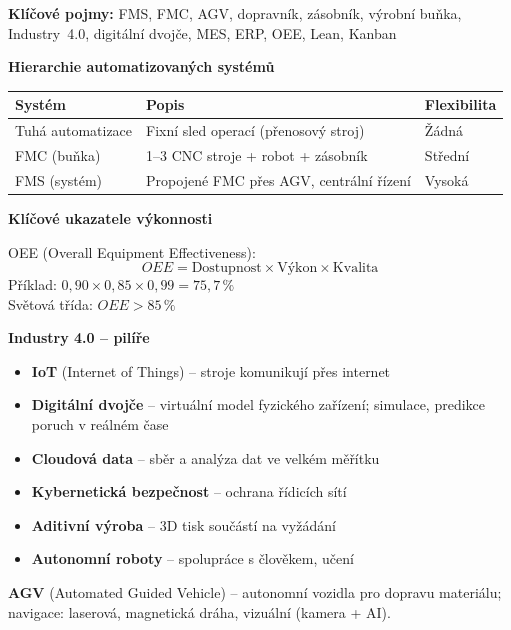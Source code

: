 \documentclass[a4paper,10pt]{article}
\begin{document}
\begin{pojmybox}
\textbf{Klíčové pojmy:}
FMS, FMC, AGV, dopravník, zásobník, výrobní buňka,
Industry~4.0, digitální dvojče, MES, ERP, OEE, Lean, Kanban
\end{pojmybox}

\begin{vysvetlenibox}
\textbf{Hierarchie automatizovaných systémů}

\begin{center}
\begin{tabularx}{0.95\linewidth}{@{} l X X @{}}
    \toprule
    \textbf{Systém} & \textbf{Popis} & \textbf{Flexibilita} \\
    \midrule
    Tuhá automatizace & Fixní sled operací (přenosový stroj) & Žádná \\
    FMC (buňka)      & 1--3 CNC stroje + robot + zásobník & Střední \\
    FMS (systém)     & Propojené FMC přes AGV, centrální řízení & Vysoká \\
    \bottomrule
\end{tabularx}
\end{center}

\textbf{Klíčové ukazatele výkonnosti}

\begin{vzorcebox}
OEE (Overall Equipment Effectiveness):
$$OEE = \text{Dostupnost} \times \text{Výkon} \times \text{Kvalita}$$
Příklad: $0{,}90 \times 0{,}85 \times 0{,}99 = 75{,}7\,\%$\\
Světová třída: $OEE > 85\,\%$
\end{vzorcebox}

\textbf{Industry 4.0 -- pilíře}
\begin{itemize}[noitemsep, leftmargin=1.4em, topsep=4pt]
    \item \textbf{IoT} (Internet of Things) -- stroje komunikují přes internet
    \item \textbf{Digitální dvojče} -- virtuální model fyzického zařízení;
          simulace, predikce poruch v reálném čase
    \item \textbf{Cloudová data} -- sběr a analýza dat ve velkém měřítku
    \item \textbf{Kybernetická bezpečnost} -- ochrana řídicích sítí
    \item \textbf{Aditivní výroba} -- 3D tisk součástí na vyžádání
    \item \textbf{Autonomní roboty} -- spolupráce s člověkem, učení
\end{itemize}

\textbf{AGV} (Automated Guided Vehicle) -- autonomní vozidla pro dopravu
materiálu; navigace: laserová, magnetická dráha, vizuální (kamera + AI).
\end{vysvetlenibox}
\end{document}
